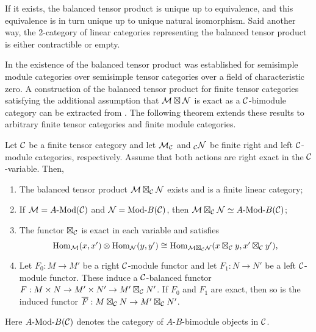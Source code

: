 \documentclass{amsart}
\begin{document}
If it exists, the balanced tensor product is unique up to equivalence, and this equivalence is in turn unique up to unique natural isomorphism. Said another way, the 2-category of linear categories representing the balanced tensor product is either contractible or empty. 

In \cite{0909.3140} the existence of the balanced tensor product was established for semisimple module categories over semisimple tensor categories over a field of characteristic zero.  A construction of the balanced tensor product for finite tensor categories satisfying the additional assumption that $\mathcal M \boxtimes \mathcal N$ is exact as a $\mathcal C$-bimodule category can be extracted from \cite[Thm 3.1]{1102.3411}. The following theorem extends these results to arbitrary finite tensor categories and finite module categories. 

\begin{theorem} \label{thm:DelignePrdtOverATCExists}   
	Let $\mathcal C$ be a finite tensor category and let $\mathcal M_{\mathcal C}$ and ${}_{\mathcal C}\mathcal N$ be finite right and left $\mathcal C$-module categories, respectively. Assume that both actions are right exact in the $\mathcal C$-variable. Then,
	\begin{enumerate}
		\item The balanced tensor product $\mathcal M \boxtimes_{\mathcal C} \mathcal N$ exists and is a finite linear category;
		\item If $\cM = \Mod{A}{}(\cC)$ and $\cN = \Mod{}{B}(\cC)$, then $\cM \boxtimes_{\cC} \cN \simeq \Mod{A }{B}(\cC)$;

		\item The functor $\boxtimes_{\mathcal C}$ is exact in each variable and satisfies 
		\begin{equation*}
			\operatorname{Hom}_{\mathcal M}(x,x') \otimes \operatorname{Hom}_{\mathcal N}(y, y') \cong \operatorname{Hom}_{\mathcal M \boxtimes_{\mathcal C} \mathcal N} (x \boxtimes_{\mathcal C} y, x' \boxtimes_{\mathcal C} y'),
		\end{equation*}
		\item Let $F_0: M \to M'$ be a right $\mathcal C$-module functor and let $F_1: N \to N'$ be a left $\mathcal C$-module functor. These induce a $\mathcal C$-balanced functor $F: M \times N \to M' \times N' \to M' \boxtimes_{\mathcal C} N'$. If $F_0$ and $F_1$ are exact, then so is the induced functor $\overline{F}: M \boxtimes_{\mathcal C} N \to M' \boxtimes_{\mathcal C} N'$.
	\end{enumerate} 
\nid Here $\Mod{A}{B}(\cC)$ denotes the category of $A$-$B$-bimodule objects in $\mathcal C$.
\end{theorem}
\end{document}
